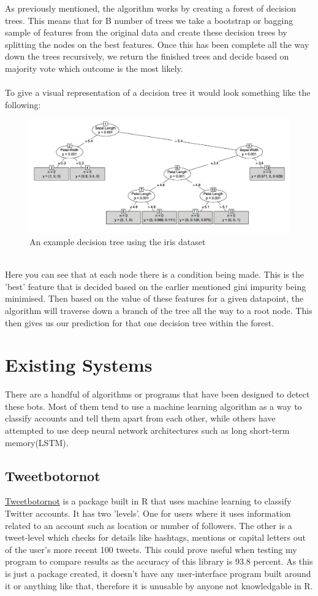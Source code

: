 As previously mentioned, the algorithm works by creating a forest of decision trees. This means that for B number of trees we take a bootstrap or bagging sample of features from the original data and create these decision trees by splitting the nodes on the best features. Once this has been complete all the way down the trees recursively, we return the finished trees and decide based on majority vote which outcome is the most likely. 
\\
\\
\clearpage
To give a visual representation of a decision tree it would look something like the following:
\begin{figure}[h]
	\includegraphics[width=150mm]{figures/tree}
	\caption{An example decision tree using the iris dataset}
\end{figure}
\\
Here you can see that at each node there is a condition being made. This is the 'best' feature that is decided based on the earlier mentioned gini impurity being minimised. Then based on the value of these features for a given datapoint, the algorithm will traverse down a branch of the tree all the way to a root node. This then gives us our prediction for that one decision tree within the forest. 


\section{Existing Systems}
There are a handful of algorithms or programs that have been designed to detect these bots. Most of them tend to use a machine learning algorithm as a way to classify accounts and tell them apart from each other, while others have attempted to use deep neural network architectures such as long short-term memory(LSTM).  


\subsection{Tweetbotornot}
\href{https://github.com/mkearney/tweetbotornot}{Tweetbotornot} is a package built in R that uses machine learning to classify Twitter accounts. It has two 'levels'. One for users where it uses information related to an account such as location or number of followers. The other is a tweet-level which checks for details like hashtags, mentions or capital letters out of the user's more recent 100 tweets. 
This could prove useful when testing my program to compare results as the accuracy of this library is 93.8 percent. As this is just a package created, it doesn't have any user-interface program built around it or anything like that, therefore it is unusable by anyone not knowledgable in R. 

